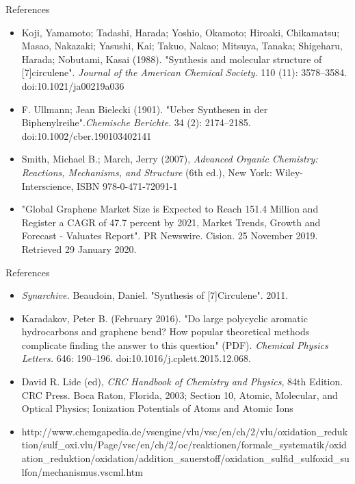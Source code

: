 \documentclass[notes]{beamer}
\begin{document}
\begin{frame}{References}
\begin{itemize}
\item
Koji, Yamamoto; Tadashi, Harada; Yoshio, Okamoto; Hiroaki, Chikamatsu; Masao, Nakazaki; Yasushi, Kai; Takuo, Nakao; Mitsuya, Tanaka; Shigeharu, Harada; Nobutami, Kasai (1988). "Synthesis and molecular structure of [7]circulene". \textit{Journal of the American Chemical Society}. 110 (11): 3578–3584. doi:10.1021/ja00219a036

\item
 F. Ullmann; Jean Bielecki (1901). "Ueber Synthesen in der Biphenylreihe".\textit{Chemische Berichte}. 34 (2): 2174–2185. doi:10.1002/cber.190103402141
 
\item
 Smith, Michael B.; March, Jerry (2007), \textit{Advanced Organic Chemistry: Reactions, Mechanisms, and Structure} (6th ed.), New York: Wiley-Interscience, ISBN 978-0-471-72091-1
 \item
 "Global Graphene Market Size is Expected to Reach 151.4 Million and Register a CAGR of 47.7 percent by 2021, Market Trends, Growth and Forecast - Valuates Report". PR Newswire. Cision. 25 November 2019. Retrieved 29 January 2020.
\end{itemize}
    
\end{frame}

\begin{frame}{References}
\begin{itemize}
    \item 
    \textit{Synarchive.} Beaudoin, Daniel. "Synthesis of [7]Circulene". 2011.
    \item
    Karadakov, Peter B. (February 2016). "Do large polycyclic aromatic hydrocarbons and graphene bend? How popular theoretical methods complicate finding the answer to this question" (PDF). \textit{Chemical Physics Letters.} 646: 190–196. doi:10.1016/j.cplett.2015.12.068.
    \item
    David R. Lide (ed), \textit{CRC Handbook of Chemistry and Physics}, 84th Edition. CRC Press. Boca Raton, Florida, 2003; Section 10, Atomic, Molecular, and Optical Physics; Ionization Potentials of Atoms and Atomic Ions
    \item
    http://www.chemgapedia.de/vsengine/vlu/vsc/en/ch/2/vlu/oxidation_reduktion/sulf_oxi.vlu/Page/vsc/en/ch/2/oc/reaktionen/formale_systematik/oxidation_reduktion/oxidation/addition_sauerstoff/oxidation_sulfid_sulfoxid_sulfon/mechanismus.vscml.htm

\end{itemize}
\end{frame}
\end{document}
